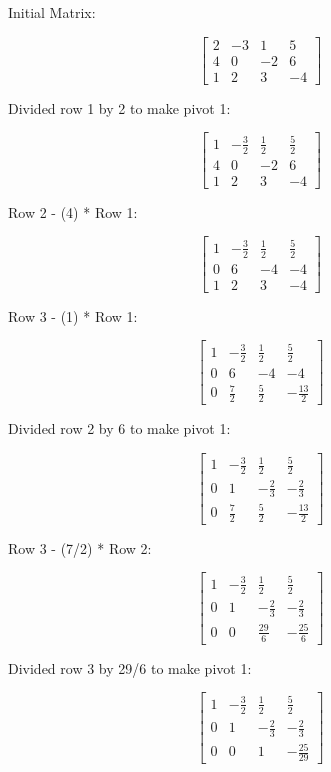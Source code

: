 \documentclass{article}
\begin{document}
    Initial Matrix:

\[ \left[\begin{matrix}2 & -3 & 1 & 5\\4 & 0 & -2 & 6\\1 & 2 & 3 & -4\end{matrix}\right] \]

Divided row 1 by 2 to make pivot 1:

\[ \left[\begin{matrix}1 & - \frac{3}{2} & \frac{1}{2} & \frac{5}{2}\\4 & 0 & -2 & 6\\1 & 2 & 3 & -4\end{matrix}\right] \]

Row 2 - (4) * Row 1:

\[ \left[\begin{matrix}1 & - \frac{3}{2} & \frac{1}{2} & \frac{5}{2}\\0 & 6 & -4 & -4\\1 & 2 & 3 & -4\end{matrix}\right] \]

Row 3 - (1) * Row 1:

\[ \left[\begin{matrix}1 & - \frac{3}{2} & \frac{1}{2} & \frac{5}{2}\\0 & 6 & -4 & -4\\0 & \frac{7}{2} & \frac{5}{2} & - \frac{13}{2}\end{matrix}\right] \]

Divided row 2 by 6 to make pivot 1:

\[ \left[\begin{matrix}1 & - \frac{3}{2} & \frac{1}{2} & \frac{5}{2}\\0 & 1 & - \frac{2}{3} & - \frac{2}{3}\\0 & \frac{7}{2} & \frac{5}{2} & - \frac{13}{2}\end{matrix}\right] \]

Row 3 - (7/2) * Row 2:

\[ \left[\begin{matrix}1 & - \frac{3}{2} & \frac{1}{2} & \frac{5}{2}\\0 & 1 & - \frac{2}{3} & - \frac{2}{3}\\0 & 0 & \frac{29}{6} & - \frac{25}{6}\end{matrix}\right] \]

Divided row 3 by 29/6 to make pivot 1:

\[ \left[\begin{matrix}1 & - \frac{3}{2} & \frac{1}{2} & \frac{5}{2}\\0 & 1 & - \frac{2}{3} & - \frac{2}{3}\\0 & 0 & 1 & - \frac{25}{29}\end{matrix}\right] \]
\end{document}
